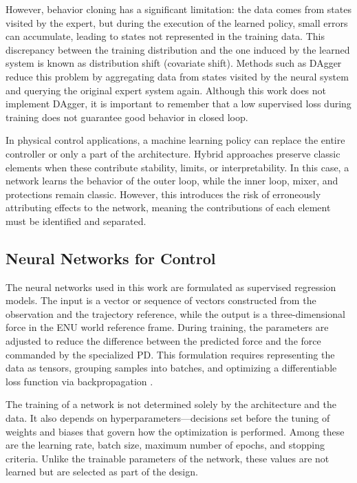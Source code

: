 However, behavior cloning has a significant limitation: the data comes from states visited by the expert, but during the execution of the learned policy, small errors can accumulate, leading to states not represented in the training data. This discrepancy between the training distribution and the one induced by the learned system is known as distribution shift (covariate shift). Methods such as DAgger \cite{ross2011dagger} reduce this problem by aggregating data from states visited by the neural system and querying the original expert system again. Although this work does not implement DAgger, it is important to remember that a low supervised loss during training does not guarantee good behavior in closed loop.

In physical control applications, a machine learning policy can replace the entire controller or only a part of the architecture. Hybrid approaches preserve classic elements when these contribute stability, limits, or interpretability. In this case, a network learns the behavior of the outer loop, while the inner loop, mixer, and protections remain classic. However, this introduces the risk of erroneously attributing effects to the network, meaning the contributions of each element must be identified and separated.

\subsection{Neural Networks for Control}

The neural networks used in this work are formulated as supervised regression models. The input is a vector or sequence of vectors constructed from the observation and the trajectory reference, while the output is a three-dimensional force in the ENU world reference frame. During training, the parameters are adjusted to reduce the difference between the predicted force and the force commanded by the specialized PD. This formulation requires representing the data as tensors, grouping samples into batches, and optimizing a differentiable loss function via backpropagation \cite{rumelhart1986learning,pytorchDocs}.

The training of a network is not determined solely by the architecture and the data. It also depends on hyperparameters---decisions set before the tuning of weights and biases that govern how the optimization is performed. Among these are the learning rate, batch size, maximum number of epochs, and stopping criteria. Unlike the trainable parameters of the network, these values are not learned but are selected as part of the design.

